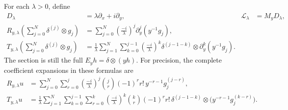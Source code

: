 For each $\lambda>0$, define
\begin{align}
 D_\lambda&=\lambda\partial_x+i\partial_y,
       &\mathcal L_\lambda&=M_yD_\lambda,
       &&\tag{SDB44}\label{eq:SDB-lambdaD}\\
 R_{y,\lambda}\!\left(\sum_{j=0}^N\delta^{(j)}\otimes g_j\right)
   &=\sum_{j=0}^N\left(\frac{-i}{\lambda}\right)^j
                     \partial_y^j(y^{-1}g_j),
       &&&&\tag{SDB45}\label{eq:SDB-lambdaR}\\
 T_{y,\lambda}\!\left(\sum_{j=0}^N\delta^{(j)}\otimes g_j\right)
   &=\frac1\lambda\sum_{j=1}^N\sum_{k=0}^{j-1}
       \left(\frac{-i}{\lambda}\right)^k
       \delta^{(j-1-k)}\otimes\partial_y^k(y^{-1}g_j).
       &&&&\tag{SDB46}\label{eq:SDB-lambdaT}
\end{align}
The section is still the full $E_yh=\delta\otimes(yh)$.
For precision, the complete coefficient expansions in these formulas are
\begin{align}
 R_{y,\lambda}u
 &=\sum_{j=0}^N\sum_{r=0}^j
    \left(\frac{-i}{\lambda}\right)^j
    \binom jr(-1)^r r!\,y^{-r-1}g_j^{(j-r)},
       &&\tag{SDB47}\label{eq:SDB-lambdaRfull}\\
 T_{y,\lambda}u
 &=\frac1\lambda\sum_{j=1}^N\sum_{k=0}^{j-1}\sum_{r=0}^k
    \left(\frac{-i}{\lambda}\right)^k
    \binom kr(-1)^r r!\,
       \delta^{(j-1-k)}\otimes
          \bigl(y^{-r-1}g_j^{(k-r)}\bigr).
       &&\tag{SDB48}\label{eq:SDB-lambdaTfull}
\end{align}

